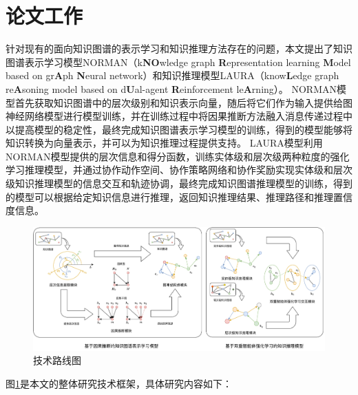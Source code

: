 \documentclass[algorithmlist, AutoFakeBold, AutoFakeSlant, figurelist, tablelist, nomlist, engineering]{seuthesix}
\begin{document}
\section{论文工作}
针对现有的面向知识图谱的表示学习和知识推理方法存在的问题，本文提出了知识图谱表示学习模型NORMAN（k\textbf{NO}wledge graph \textbf{R}epresentation learning \textbf{M}odel based on gr\textbf{A}ph \textbf{N}eural network）和知识推理模型LAURA（know\textbf{L}edge graph re\textbf{A}soning model based on d\textbf{U}al-agent \textbf{R}einforcement le\textbf{A}rning）。
NORMAN模型首先获取知识图谱中的层次级别和知识表示向量，随后将它们作为输入提供给图神经网络模型进行模型训练，并在训练过程中将因果推断方法融入消息传递过程中以提高模型的稳定性，最终完成知识图谱表示学习模型的训练，得到的模型能够将知识转换为向量表示，并可以为知识推理过程提供支持。
LAURA模型利用NORMAN模型提供的层次信息和得分函数，训练实体级和层次级两种粒度的强化学习推理模型，并通过协作动作空间、协作策略网络和协作奖励实现实体级和层次级知识推理模型的信息交互和轨迹协调，最终完成知识图谱推理模型的训练，得到的模型可以根据给定知识信息进行推理，返回知识推理结果、推理路径和推理置信度信息。
\begin{figure}
  \centering
  \includegraphics[width=1.0\textwidth]{1_Total}
  \caption{技术路线图}
  \label{1_Total}
\end{figure}
图\ref{1_Total}是本文的整体研究技术框架，具体研究内容如下：
\end{document}
